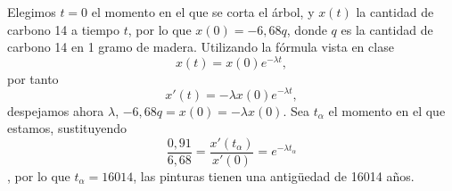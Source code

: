 \documentclass[../main.tex]{subfiles}
\begin{document}
\begin{solution}
	Elegimos \(t = 0\) el momento en el que se corta el árbol, y \(x(t)\)
	la cantidad de carbono 14 a tiempo \(t\), por lo que \(x(0) = -6,68 q\),
	donde \(q\) es la cantidad de carbono 14 en 1 gramo de madera.
	Utilizando la fórmula vista en clase 
	\[x(t) = x(0) e^{-\lambda t},\]
	por tanto
	\[x'(t) = -\lambda x(0) e^{-\lambda t},\]
	despejamos ahora \(\lambda\), \(-6,68 q = x(0) = -\lambda x(0)\). Sea 
	\(t_\alpha\) el momento en el que estamos, sustituyendo
	\[\frac{0,91}{6,68} = \frac{x'(t_\alpha)}{x'(0)} = e^{-\lambda t_\alpha}\],
	por lo que \(t_\alpha = 16014\), las pinturas tienen una antigüedad de 16014
	años.
\end{solution}
\end{document}
